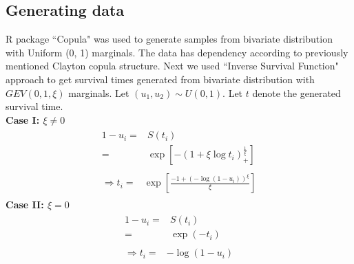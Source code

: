 \documentclass[11pt]{article}
\theoremstyle{remboldstyle}
\begin{document}
\subsection{Generating data}
\noindent
R package ``Copula" was used to generate samples from bivariate distribution with Uniform (0, 1) marginals. The data has dependency according to previously mentioned Clayton copula structure. Next we used ``Inverse Survival Function" approach to get survival times generated from bivariate distribution with $GEV(0,1, \xi)$ marginals. Let $(u_1, u_2) \sim U(0, 1)$. Let $t$ denote the generated survival time. \\
\textbf{Case I: $\xi \neq 0$}
\begin{align}
\begin{split}
1 - u_i = {} &  S(t_i) \\
          = & \exp[-(1 + \xi \log t_i)_{+}^{\frac{1}{\xi}}]
\end{split}\\
\begin{split}
\Rightarrow t_i = {} & \exp[\frac{- 1 + (-\log(1 - u_i))^{\xi}}{\xi}]
\end{split}
\end{align}
\textbf{Case II: $\xi = 0$}
\begin{align}
\begin{split}
1 - u_i = {} &  S(t_i) \\
          = & \exp(-t_i)
\end{split}\\
\begin{split}
\Rightarrow t_i = {} & - \log(1 - u_i)
\end{split}
\end{align}
\end{document}
